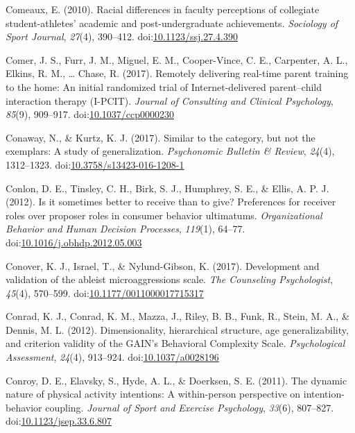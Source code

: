 \documentclass[english,man]{apa6}
\begin{document}
\hypertarget{ref-Comeaux2010}{}
Comeaux, E. (2010). Racial differences in faculty perceptions of
collegiate student-athletes' academic and post-undergraduate
achievements. \emph{Sociology of Sport Journal}, \emph{27}(4), 390--412.
doi:\href{https://doi.org/10.1123/ssj.27.4.390}{10.1123/ssj.27.4.390}

\hypertarget{ref-Comer2017a}{}
Comer, J. S., Furr, J. M., Miguel, E. M., Cooper-Vince, C. E.,
Carpenter, A. L., Elkins, R. M., \ldots{} Chase, R. (2017). Remotely
delivering real-time parent training to the home: An initial randomized
trial of Internet-delivered parent--child interaction therapy (I-PCIT).
\emph{Journal of Consulting and Clinical Psychology}, \emph{85}(9),
909--917.
doi:\href{https://doi.org/10.1037/ccp0000230}{10.1037/ccp0000230}

\hypertarget{ref-Conaway2016}{}
Conaway, N., \& Kurtz, K. J. (2017). Similar to the category, but not
the exemplars: A study of generalization. \emph{Psychonomic Bulletin \&
Review}, \emph{24}(4), 1312--1323.
doi:\href{https://doi.org/10.3758/s13423-016-1208-1}{10.3758/s13423-016-1208-1}

\hypertarget{ref-Conlon2012}{}
Conlon, D. E., Tinsley, C. H., Birk, S. J., Humphrey, S. E., \& Ellis,
A. P. J. (2012). Is it sometimes better to receive than to give?
Preferences for receiver roles over proposer roles in consumer behavior
ultimatums. \emph{Organizational Behavior and Human Decision Processes},
\emph{119}(1), 64--77.
doi:\href{https://doi.org/10.1016/j.obhdp.2012.05.003}{10.1016/j.obhdp.2012.05.003}

\hypertarget{ref-Conover2017}{}
Conover, K. J., Israel, T., \& Nylund-Gibson, K. (2017). Development and
validation of the ableist microaggressions scale. \emph{The Counseling
Psychologist}, \emph{45}(4), 570--599.
doi:\href{https://doi.org/10.1177/0011000017715317}{10.1177/0011000017715317}

\hypertarget{ref-Conrad2012}{}
Conrad, K. J., Conrad, K. M., Mazza, J., Riley, B. B., Funk, R., Stein,
M. A., \& Dennis, M. L. (2012). Dimensionality, hierarchical structure,
age generalizability, and criterion validity of the GAIN's Behavioral
Complexity Scale. \emph{Psychological Assessment}, \emph{24}(4),
913--924. doi:\href{https://doi.org/10.1037/a0028196}{10.1037/a0028196}

\hypertarget{ref-Conroy2011}{}
Conroy, D. E., Elavsky, S., Hyde, A. L., \& Doerksen, S. E. (2011). The
dynamic nature of physical activity intentions: A within-person
perspective on intention-behavior coupling. \emph{Journal of Sport and
Exercise Psychology}, \emph{33}(6), 807--827.
doi:\href{https://doi.org/10.1123/jsep.33.6.807}{10.1123/jsep.33.6.807}
\end{document}

